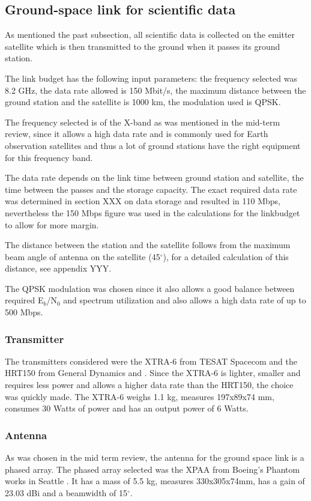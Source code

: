 \subsection{Ground-space link for scientific data}
As mentioned the past subsection, all scientific data is collected on the emitter satellite which is then transmitted to the ground when it passes its ground station.

The link budget has the following input parameters: the frequency selected was 8.2 GHz, the data rate allowed is 150 Mbit/s, the maximum distance between the ground station and the satellite is 1000 km, the modulation used is QPSK.

The frequency selected is of the X-band as was mentioned in the mid-term review, since it allows a high data rate and is commonly used for Earth observation satellites and thus a lot of ground stations have the right equipment for this frequency band.

The data rate depends on the link time between ground station and satellite, the time between the passes and the storage capacity. The exact required data rate was determined in section XXX on data storage and resulted in 110 Mbps, nevertheless the 150 Mbps figure was used in the calculations for the linkbudget to allow for more margin.

The distance between the station and the satellite follows from the maximum beam angle of antenna on the satellite (45$^{\circ}$), for a detailed calculation of this distance, see appendix YYY.

The QPSK modulation was chosen since it also allows a good balance between required E$_{b}$/N$_{0}$ and spectrum utilization and also allows a high data rate of up to 500 Mbps.

\subsubsection{Transmitter}
The transmitters considered were the XTRA-6 from TESAT Spacecom \cite{TESATxtra} and the HRT150 from General Dynamics and \cite{HRT150}. Since the XTRA-6 is lighter, smaller and requires less power and allows a higher data rate than the HRT150, the choice was quickly made.
The XTRA-6 weighs 1.1 kg, measures 197x89x74 mm, consumes 30 Watts of power and has an output power of 6 Watts.

\subsubsection{Antenna}
As was chosen in the mid term review, the antenna for the ground space link is a phased array. The phased array selected was the XPAA from Boeing's Phantom works in Seattle \cite{XPAA}. It has a mass of 5.5 kg, measures 330x305x74mm, has a gain of 23.03 dBi and a beamwidth of 15$^{\circ}$.

